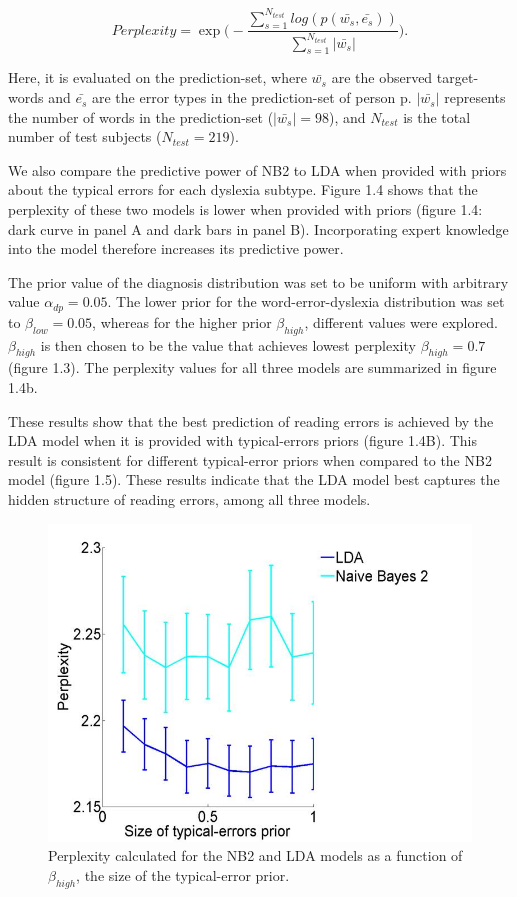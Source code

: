 {{{\begin{equation}
Perplexity = \exp{\Bigg(-\frac{\sum_{s=1}^{N_{test}} log(p(\bar{w_s}, \bar{e_s}))}{\sum_{s=1}^{N_{test}}|\bar{w_s}|}\Bigg)}.
\end{equation}

Here, it is evaluated on the prediction-set, where $ \bar{w_s} $ are the observed target-words and $ \bar{e_s} $ are the error types in the prediction-set of person p. $|\bar{w_s}|$ represents the number of words in the prediction-set ($|\bar{w_s}| = 98$), and $ N_{test} $ is the total number of test subjects ($ N_{test} = 219 $).

We also compare the predictive power of NB2 to LDA when provided with priors about the typical errors for each dyslexia subtype. Figure 1.4 shows that the perplexity of these two models is lower when provided with priors (figure 1.4: dark curve in panel A and dark bars in panel B). Incorporating expert knowledge into the model therefore increases its predictive power.

The prior value of the diagnosis distribution was set to be uniform with arbitrary value $ \alpha_{dp} = 0.05 $. The lower prior for the word-error-dyslexia distribution was set to $ \beta_{low} = 0.05 $, whereas for the higher prior $ \beta_{high} $, different values were explored. $ \beta_{high} $ is then chosen to be the value that achieves lowest perplexity $ \beta_{high} = 0.7 $ (figure 1.3). The perplexity values for all three models are summarized in figure 1.4b.

These results show that the best prediction of reading errors is achieved by the LDA model when it is provided with typical-errors priors (figure 1.4B). This result is consistent for different typical-error priors when compared to the NB2 model (figure 1.5). These results indicate that the LDA model best captures the hidden structure of reading errors, among all three models.

\begin{figure}[H]
\vspace{.3in}
\includegraphics[width=\linewidth]{Figures/Ch1/figure5C.jpg}
\vspace{.3in}
\caption{Perplexity calculated for the NB2 and LDA models as a function of $\beta_{high}$, the size of the typical-error prior.}
\end{figure}

}}}
